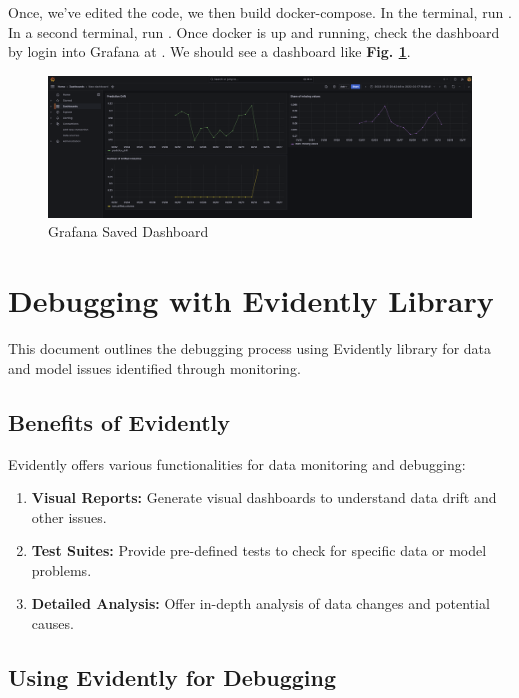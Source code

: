 \documentclass[letterpaper,12pt,notitlepage,twoside]{report}
\begin{document}
Once, we've edited the code, we then build docker-compose. In the terminal, run . In a second terminal,  run . Once docker is up and running, check the dashboard by login into Grafana at . We should see a dashboard like \textbf{Fig. \ref{fig:15}}.
\begin{figure}[h]
	\centering
	\includegraphics[width=\textwidth]{Images/grafana-dashboard.png}
	\caption{Grafana Saved Dashboard}
	\label{fig:15}
\end{figure}
\FloatBarrier

\section{Debugging with Evidently Library}
This document outlines the debugging process using Evidently library for data and model issues identified through monitoring.

\subsection{Benefits of Evidently}

Evidently offers various functionalities for data monitoring and debugging:

\begin{enumerate}
  \item \textbf{Visual Reports:} Generate visual dashboards to understand data drift and other issues.
  \item \textbf{Test Suites:} Provide pre-defined tests to check for specific data or model problems.
  \item \textbf{Detailed Analysis:} Offer in-depth analysis of data changes and potential causes.
\end{enumerate}

\subsection{Using Evidently for Debugging}
\end{document}
